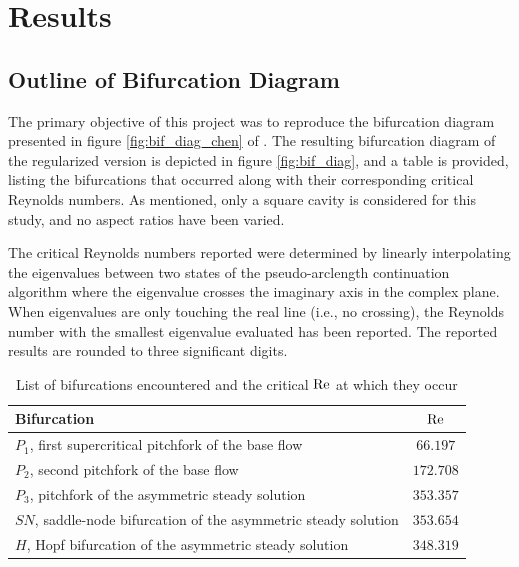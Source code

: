 
\section{Results} \label{sec:res}

\subsection{Outline of Bifurcation Diagram}

The primary objective of this project was to reproduce the bifurcation diagram
presented in figure \ref{fig:bif_diag_chen} of \citet{chen2013}. The resulting
bifurcation diagram of the regularized version is depicted in figure
\ref{fig:bif_diag}, and a table is provided, listing the bifurcations that
occurred along with their corresponding critical Reynolds numbers. As
mentioned, only a square cavity is considered for this study, and no aspect
ratios have been varied.

The critical Reynolds numbers reported were determined by linearly
interpolating the eigenvalues between two states of the pseudo-arclength
continuation algorithm where the eigenvalue crosses the imaginary axis in the
complex plane. When eigenvalues are only touching the real line (i.e., no
crossing), the Reynolds number with the smallest eigenvalue evaluated has been
reported. The reported results are rounded to three significant digits.

\begin{table}[h!]
  \centering
  \caption{List of bifurcations encountered and the critical $\mathrm{Re}$ at which they
    occur}
  \label{tab:bif_points}
\begin{tabular}{l c}
Bifurcation & $\mathrm{Re}$\\
\hline
$P_1$, first supercritical pitchfork of the base flow & $66.197$ \\
$P_2$, second pitchfork of the base flow & $172.708$ \\
$P_3$, pitchfork of the asymmetric steady solution & $353.357$ \\
$SN$, saddle-node bifurcation of the asymmetric steady solution & $353.654$ \\
$H$, Hopf bifurcation of the asymmetric steady solution & $348.319$ \\
\end{tabular}
\end{table}

